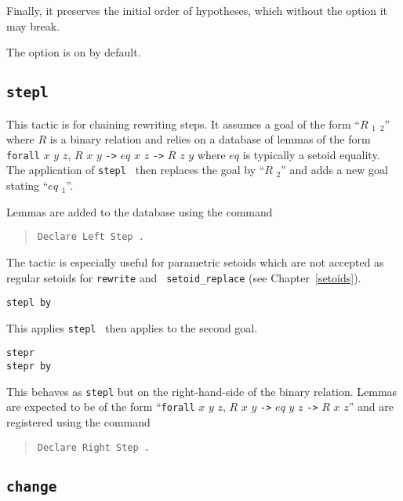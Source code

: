 \begin{coq_example*}
\begin{Variants}
Finally, it preserves the initial order of hypotheses, which without
the option it may break.

The option is on by default.

\end{Variants}

\subsection{\tt stepl \term}

This tactic is for chaining rewriting steps. It assumes a goal of the
form ``$R$ {\term}$_1$ {\term}$_2$'' where $R$ is a binary relation
and relies on a database of lemmas of the form {\tt forall} $x$ $y$
$z$, $R$ $x$ $y$ {\tt ->} $eq$ $x$ $z$ {\tt ->} $R$ $z$ $y$ where $eq$
is typically a setoid equality. The application of {\tt stepl {\term}}
then replaces the goal by ``$R$ {\term} {\term}$_2$'' and adds a new
goal stating ``$eq$ {\term} {\term}$_1$''.

Lemmas are added to the database using the command
\begin{quote}
{\tt Declare Left Step {\term}.}
\end{quote}

The tactic is especially useful for parametric setoids which are not
accepted as regular setoids for {\tt rewrite} and {\tt
  setoid\_replace} (see Chapter~\ref{setoids}).

\begin{Variants}
\item{\tt stepl {\term} by {\tac}}

This applies {\tt stepl {\term}} then applies {\tac} to the second goal.

\item{\tt stepr {\term}}\\
     {\tt stepr {\term} by {\tac}}

This behaves as {\tt stepl} but on the right-hand-side of the binary relation.
Lemmas are expected to be of the form
``{\tt forall} $x$ $y$
$z$, $R$ $x$ $y$ {\tt ->} $eq$ $y$ $z$ {\tt ->} $R$ $x$ $z$''
and are registered using the command
\begin{quote}
{\tt Declare Right Step {\term}.}
\end{quote}
\end{Variants}

\subsection{\tt change \term}
\label{change}


\end{coq_example*}
